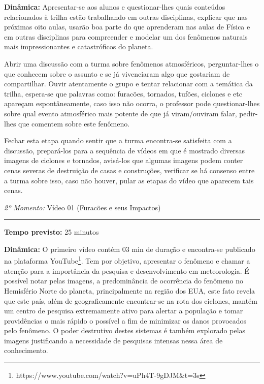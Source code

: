 \noindent\textbf{Dinâmica:} Apresentar-se aos alunos e questionar-lhes quais conteúdos relacionados à trilha estão trabalhando em outras disciplinas, explicar que nas próximas oito aulas, usarão boa parte do que aprenderam nas aulas de Física e em outras disciplinas para compreender e modelar um dos fenômenos naturais mais impressionantes e catastróficos do planeta.

Abrir uma discussão com a turma sobre fenômenos atmosféricos, perguntar-lhes o que conhecem sobre o assunto e se já vivenciaram algo que gostariam de compartilhar. Ouvir atentamente o grupo e tentar relacionar com a temática da trilha, espera-se que palavras como: furacões, tornados, tufões, ciclones e etc apareçam espontâneamente, caso isso não ocorra, o professor pode questionar-lhes sobre qual evento atmosférico mais potente de que já viram/ouviram falar, pedir-lhes que comentem sobre este fenômeno.

Fechar esta etapa quando sentir que a turma encontra-se satisfeita com a discussão, prepará-los para a sequência de vídeos em que é mostrado diversas imagens de ciclones e tornados, avisá-los que algumas imagens podem conter cenas severas de destruição de casas e construções, verificar se há consenso entre a turma sobre isso, caso não houver, pular as etapas do vídeo que aparecem tais cenas.

\vspace{50pt}
\noindent\emph{2º Momento:} Vídeo 01 (Furacões e seus Impactos)
\par\noindent\rule{.3\textwidth}{.5pt}    
\par\noindent\textbf{Tempo previsto:} 25 minutos


\noindent\textbf{Dinâmica:} O primeiro vídeo contém 03 min de duração e encontra-se publicado na plataforma YouTube\footnote{https://www.youtube.com/watch?v=uPh4T-9gDJM\&t=3s}. Tem por objetivo, apresentar o fenômeno e chamar a atenção para a importância da pesquisa e desenvolvimento em meteorologia. É possível notar pelas imagens, a predominância de ocorrência do fenômeno no Hemisfério Norte do planeta, principalmente na região dos EUA, este fato revela que este país, além de geograficamente encontrar-se na rota dos ciclones, mantém um centro de pesquisa extremamente ativo para alertar a população e tomar providências o mais rápido o possível a fim de minimizar os danos provocados pelo fenômeno. O poder destrutivo destes sistemas é também explorado pelas imagens justificando a necessidade de pesquisas intensas nessa área de conhecimento.

